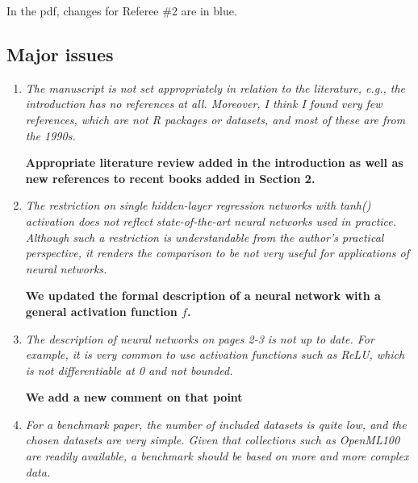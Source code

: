 \documentclass[12pt]{article}
\newcommand{\blue}[1]{{\color{blue}#1}}
\begin{document}
In the pdf, changes for Referee \#2 are in \blue{blue}.  

\subsection*{Major issues}

\begin{enumerate}
\item \textit{The manuscript is not set appropriately in relation to the literature, e.g., the introduction has no references at all. Moreover, I think I found very few references, which are not R packages or datasets, and most of these are from the 1990s.}

\textbf{Appropriate literature review added in the introduction as well 
as new references to recent books added in Section 2.
}


\item \textit{The restriction on single hidden-layer regression networks with tanh() activation does not reflect state-of-the-art neural networks used in practice. Although such a restriction is understandable from the author’s practical perspective, it renders the comparison to be not very useful for applications of neural networks.}

\textbf{We updated the formal description of a neural network with a general activation function $f$.}

\item \textit{The description of neural networks on pages 2-3 is not up to date. For example, it is very common to use activation functions such as ReLU, which is not differentiable at 0 and not bounded.}

\textbf{We add a new comment on that point}


\item \textit{For a benchmark paper, the number of included datasets is quite low, and the chosen datasets are very simple. Given that collections such as OpenML100 are readily available, a benchmark should be based on more and more complex data.}


\end{enumerate}
\end{document}
